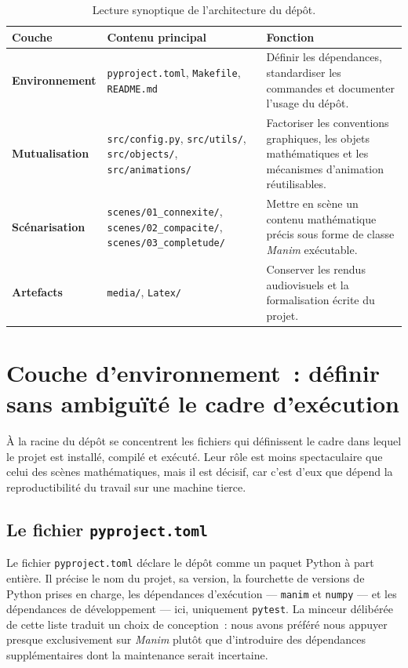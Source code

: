 \documentclass[12pt, a4paper, openany]{report}
\begin{document}
	\begin{table}[htbp]
		\centering
		\caption{Lecture synoptique de l’architecture du dépôt.}
		\renewcommand{\arraystretch}{1.25}
		\begin{tabular}{
			>{\bfseries}p{3.2cm}
			p{4.2cm}
			p{6.2cm}
		}
			\toprule
			\rowcolor{SorbonneBleu!8}
			\textcolor{SorbonneBleu}{Couche} &
			\textcolor{SorbonneBleu}{Contenu principal} &
			\textcolor{SorbonneBleu}{Fonction} \\
			\midrule
			Environnement &
			\texttt{pyproject.toml}, \texttt{Makefile}, \texttt{README.md} &
			Définir les dépendances, standardiser les commandes et documenter l’usage du dépôt. \\
			Mutualisation &
			\texttt{src/config.py}, \texttt{src/utils/}, \texttt{src/objects/}, \texttt{src/animations/} &
			Factoriser les conventions graphiques, les objets mathématiques et les mécanismes d’animation réutilisables. \\
			Scénarisation &
			\texttt{scenes/01\_connexite/}, \texttt{scenes/02\_compacite/}, \texttt{scenes/03\_completude/} &
			Mettre en scène un contenu mathématique précis sous forme de classe \textit{Manim} exécutable. \\
			Artefacts &
			\texttt{media/}, \texttt{Latex/} &
			Conserver les rendus audiovisuels et la formalisation écrite du projet. \\
			\bottomrule
		\end{tabular}
	\end{table}
	
	\section{Couche d’environnement~: définir sans ambiguïté le cadre d’exécution}

	À la racine du dépôt se concentrent les fichiers qui définissent le cadre dans lequel le projet est installé, compilé et exécuté. Leur rôle est moins spectaculaire que celui des scènes mathématiques, mais il est décisif, car c’est d’eux que dépend la reproductibilité du travail sur une machine tierce.

	\subsection{Le fichier \texttt{pyproject.toml}}

	Le fichier \texttt{pyproject.toml} déclare le dépôt comme un paquet Python à part entière. Il précise le nom du projet, sa version, la fourchette de versions de Python prises en charge, les dépendances d’exécution — \texttt{manim} et \texttt{numpy} — et les dépendances de développement — ici, uniquement \texttt{pytest}. La minceur délibérée de cette liste traduit un choix de conception~: nous avons préféré nous appuyer presque exclusivement sur \textit{Manim} plutôt que d’introduire des dépendances supplémentaires dont la maintenance serait incertaine.
\end{document}
